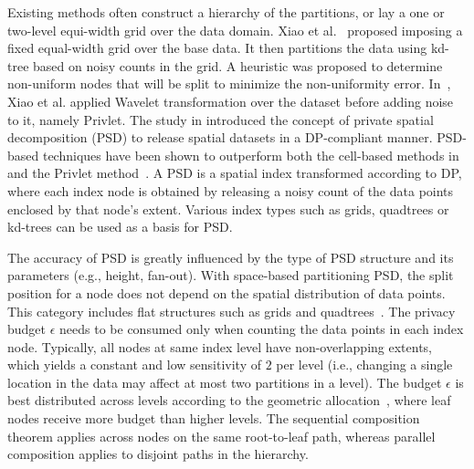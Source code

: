 \documentclass{USC-Thesis}
\numberwithin{equation}{chapter}
\begin{document}
Existing methods often construct a hierarchy of the partitions, or lay a one or two-level equi-width grid over the data domain. Xiao et al.~\cite{xiao2010differentially} proposed imposing a fixed equal-width grid over the base data. It then partitions the data using kd-tree based on noisy counts in the grid. A heuristic was proposed to determine non-uniform nodes that will be split to minimize the non-uniformity error. In~\cite{xiao2011differential}, Xiao et al. applied Wavelet transformation over the dataset before adding noise to it, namely Privlet.
The study in \cite{cormode2012differentially} introduced the concept of private spatial decomposition (PSD) to release spatial datasets in a DP-compliant manner. PSD-based techniques have been shown to outperform both the cell-based methods in~\cite{xiao2010differentially} and the Privlet method~\cite{xiao2011differential}. A PSD is a spatial index transformed according to DP, where each index node is obtained by releasing a noisy count of the data points enclosed by that node's extent. Various index types such as grids, quadtrees or kd-trees \cite{samet2006foundations} can be used as a basis for PSD. 

The accuracy of PSD is greatly influenced by the type of PSD structure and its parameters (e.g., height, fan-out). With space-based partitioning PSD, the split position for a node does not depend on the spatial distribution of data points. This category includes flat structures such as grids
and quadtrees~\cite{samet2006foundations}. The privacy budget $\epsilon$ needs to be consumed only when counting the data points in each index node. Typically, all nodes at same index level have non-overlapping extents, which yields a constant and low sensitivity of $2$ per level (i.e., changing a single location in the data may affect at most two partitions in a level). The budget $\epsilon$ is best distributed across levels according to the geometric allocation~\cite{cormode2012differentially}, where leaf nodes receive more budget than higher levels. The sequential composition theorem applies across nodes on the same root-to-leaf path, whereas parallel composition applies to disjoint paths in the hierarchy.
\end{document}
